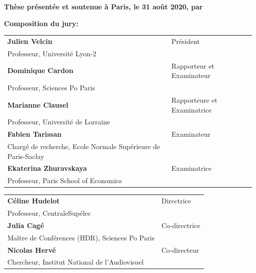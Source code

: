 \begin{titlepage}
\textbf{Thèse présentée et soutenue à Paris, le 31 août 2020, par}\\
\bigskip
\Large {\color{Prune} \textbf{\PhDname}}



\flushleft \small \textbf{Composition du jury:}
\bigskip



\scriptsize
\begin{tabular}{|p{8cm}l}
\arrayrulecolor{Prune}
\textbf{Julien Velcin} &  Président \\ 
Professeur, Université Lyon-2   &   \\ 
\textbf{Dominique Cardon} &  Rapporteur et Examinateur\\ 
Professeur, Sciences Po Paris &   \\ 
\textbf{Marianne Clausel} &  Rapporteure et Examinatrice\\ 
Professeur, Université de Lorraine   &   \\ 
\textbf{Fabien Tarissan} &   Examinateur\\ 
Chargé de recherche,  Ecole Normale Supérieure de Paris-Saclay& \\
\textbf{Ekaterina Zhuravskaya} &  Examinatrice \\ 
Professeur, Paris School of Economics   &   \\ 
\end{tabular} 

\medskip
\begin{tabular}{|p{8cm}l}\arrayrulecolor{white}
\textbf{Céline Hudelot} &   Directrice\\ 
Professeur, CentraleSupélec  & \\
\textbf{Julia Cagé} &   Co-directrice\\ 
Maître de Conférences (HDR), Sciences Po Paris  &   \\ 
\textbf{Nicolas Hervé} & Co-directeur\\ 
Chercheur, Institut National de l'Audiovisuel  &   \\



\end{tabular} 


\end{titlepage}